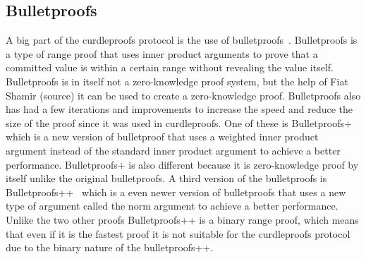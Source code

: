 \subsection{Bulletproofs}\label{sec:related-work-bulletproofs}
A big part of the curdleproofs protocol is the use of bulletproofs~\cite{bunz2018bulletproofs}.
Bulletproofs is a type of range proof that uses inner product arguments to prove that a committed value is within a certain range without revealing the value itself.
Bulletproofs is in itself not a zero-knowledge proof system, but the help of Fiat Shamir (source) it can be used to create a zero-knowledge proof.
Bulletproofs also has had a few iterations and improvements to increase the speed and reduce the size of the proof since it was used in curdleproofs.
One of these is Bulletproofs+~\cite{chung2022bulletproofs+} which is a new version of bulletproof that uses a weighted inner product argument instead of the standard inner product argument to achieve a better performance.
Bulletproofs+ is also different because it is zero-knowledge proof by itself unlike the original bulletproofs.
A third version of the bulletproofs is Bulletproofs++~\cite{eagen2024bulletproofs++} which is a even newer version of bulletproofs that uses a new type of argument called the norm argument to achieve a better performance.
Unlike the two other proofs Bulletproofs++ is a binary range proof, which means that even if it is the fastest proof it is not suitable for the curdleproofs protocol due to the binary nature of the bulletproofs++.